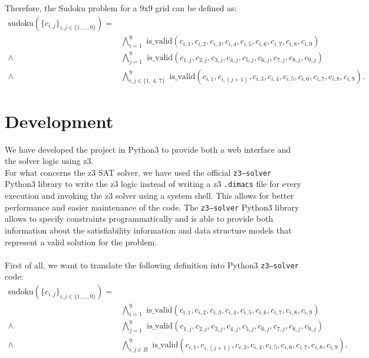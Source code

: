 \documentclass[]{usiinfprospectus}
\begin{document}
\noindent
Therefore, the Sudoku problem for a 9x9 grid can be defined as:
\setcounter{equation}{0}
\begin{align}
\text{sudoku}\left( \{ c_{i,j} \}_{i, j \in \{ 1,...,9\}} \right) = & \nonumber\\
&\bigwedge^9_{i=1} \text{ is\_valid}\left(  c_{i,1},  c_{i,2},  c_{i,3},  c_{i,4},  c_{i,5},  c_{i,6},  c_{i,7},  c_{i,8},  c_{i,9}  \right)\\
\wedge &\bigwedge^9_{j=1} \text{ is\_valid}\left( c_{1,j},  c_{2,j},  c_{3,j},  c_{4,j},  c_{5,j},  c_{6,j},  c_{7,j},  c_{8,j},  c_{9,j} \right) \\
\wedge &\bigwedge^9_{i,j \in \{1,\,4,\,7\}} \text{ is\_valid}\left( c_{i,1},  c_{i,(j+1)},  c_{i,3},  c_{i,4},  c_{i,5},  c_{i,6},  c_{i,7},  c_{i,8},  c_{i,9} \right).
\end{align}
\newpage
\section{Development}\label{development}
We have developed the project in Python3 to provide both a web interface and the solver logic using z3.\\
For what concerns the z3 SAT solver, we have used the official \texttt{z3–solver} Python3 library to write the z3 logic instead of writing a z3 \texttt{.dimacs} file for every execution and invoking the z3 solver using a system shell. This allows for better performance and easier maintenance of the code.
The \texttt{z3–solver} Python3 library allows to specify constraints programmatically and is able to provide both information about the satisfiability information and data structure models that represent a valid solution for the problem.\\ \\
First of all, we want to translate the following definition into Python3 \texttt{z3–solver} code:
\begin{align*}
\text{sudoku}\left( \{ c_{i,j} \}_{i, j \in \{ 1,...,9\}} \right) = & \nonumber\\
       & \bigwedge^9_{i=1} \text{ is\_valid}\left(  c_{i,1},  c_{i,2},  c_{i,3},  c_{i,4},  c_{i,5},  c_{i,6},  c_{i,7},  c_{i,8},  c_{i,9}  \right)\\
\wedge &\bigwedge^9_{j=1} \text{ is\_valid}\left( c_{1,j},  c_{2,j},  c_{3,j},  c_{4,j},  c_{5,j},  c_{6,j},  c_{7,j},  c_{8,j},  c_{9,j} \right) \\
\wedge &\bigwedge^9_{i,j \in B} \text{ is\_valid}\left( c_{i,1},  c_{i,(j+1)},  c_{i,3},  c_{i,4},  c_{i,5},  c_{i,6},  c_{i,7},  c_{i,8},  c_{i,9} \right).
\end{align*}
\end{document}
